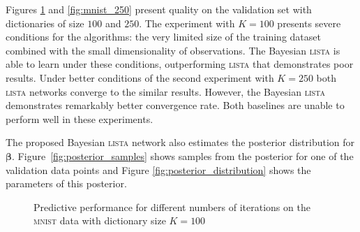 \documentclass[letterpaper]{article}
\begin{document}
Figures \ref{fig:mnist_100} and \ref{fig:mnist_250} present quality on the validation set with dictionaries of size $100$ and $250$.  The experiment with $K=100$ presents severe conditions for the algorithms: the very limited size of the training dataset combined with the small dimensionality of observations. The Bayesian \textsc{lista} is able to learn under these conditions, outperforming \textsc{lista} that demonstrates poor results. Under better conditions of the second experiment with $K=250$ both \textsc{lista} networks converge to the similar results. However, the Bayesian \textsc{lista} demonstrates remarkably better convergence rate. Both baselines are unable to perform well in these experiments.

The proposed Bayesian \textsc{lista} network also estimates the posterior distribution for $\boldsymbol\beta$. Figure~\ref{fig:posterior_samples} shows samples from the posterior for one of the validation data points and Figure \ref{fig:posterior_distribution} shows the parameters of this posterior.

\begin{figure}[t]
\centering
\caption{Predictive performance for different numbers of iterations on the \textsc{mnist} data with dictionary size $K = 100$}
\label{fig:mnist_100}
\end{figure}
\end{document}

